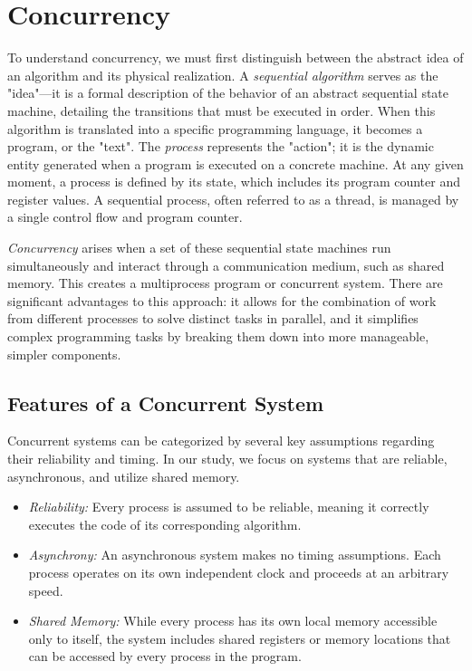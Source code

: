 \chapter{Concurrency}
To understand concurrency, we must first distinguish between the abstract idea of an algorithm and its physical realization. A \textit{sequential algorithm} serves as the "idea"—it is a formal description of the behavior of an abstract sequential state machine, detailing the transitions that must be executed in order. When this algorithm is translated into a specific programming language, it becomes a program, or the "text". The \textit{process} represents the "action"; it is the dynamic entity generated when a program is executed on a concrete machine. At any given moment, a process is defined by its state, which includes its program counter and register values. A sequential process, often referred to as a thread, is managed by a single control flow and program counter.

\textit{Concurrency} arises when a set of these sequential state machines run simultaneously and interact through a communication medium, such as shared memory. This creates a multiprocess program or concurrent system. There are significant advantages to this approach: it allows for the combination of work from different processes to solve distinct tasks in parallel, and it simplifies complex programming tasks by breaking them down into more manageable, simpler components.

\section{Features of a Concurrent System}
Concurrent systems can be categorized by several key assumptions regarding their reliability and timing. In our study, we focus on systems that are reliable, asynchronous, and utilize shared memory.
\begin{itemize}
    \item \textit{Reliability:} Every process is assumed to be reliable, meaning it correctly executes the code of its corresponding algorithm.
    \item \textit{Asynchrony:} An asynchronous system makes no timing assumptions. Each process operates on its own independent clock and proceeds at an arbitrary speed.
    \item \textit{Shared Memory:} While every process has its own local memory accessible only to itself, the system includes shared registers or memory locations that can be accessed by every process in the program.
\end{itemize}
    
